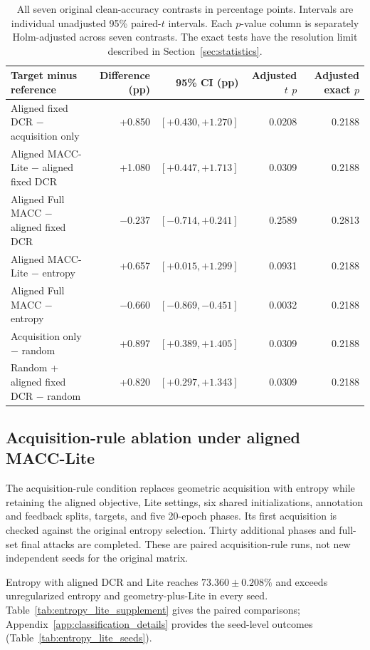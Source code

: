 \documentclass[a4paper,fleqn]{cas-dc}
\let\CAENLcaption\caption
\let\caption\CAENLcaption
\begin{document}
\begin{table}[pos=tbp]
\caption{All seven original clean-accuracy contrasts in percentage
points. Intervals are individual unadjusted 95\% paired-$t$
intervals. Each $p$-value column is separately Holm-adjusted
across seven contrasts. The exact tests have the resolution
limit described in Section~\ref{sec:statistics}.}
\label{tab:planned_contrasts}
\centering\small
\begin{tabularx}{\textwidth}{@{}Yrrrr@{}}
\toprule
Target minus reference & Difference (pp) & 95\% CI (pp) &
Adjusted $t$ $p$ & Adjusted exact $p$ \\
\midrule
Aligned fixed DCR $-$ acquisition only &
+0.850 & $[+0.430,+1.270]$ & 0.0208 & 0.2188 \\
Aligned MACC-Lite $-$ aligned fixed DCR &
+1.080 & $[+0.447,+1.713]$ & 0.0309 & 0.2188 \\
Aligned Full MACC $-$ aligned fixed DCR &
$-0.237$ & $[-0.714,+0.241]$ & 0.2589 & 0.2813 \\
Aligned MACC-Lite $-$ entropy &
+0.657 & $[+0.015,+1.299]$ & 0.0931 & 0.2188 \\
Aligned Full MACC $-$ entropy &
$-0.660$ & $[-0.869,-0.451]$ & 0.0032 & 0.2188 \\
Acquisition only $-$ random &
+0.897 & $[+0.389,+1.405]$ & 0.0309 & 0.2188 \\
Random + aligned fixed DCR $-$ random &
+0.820 & $[+0.297,+1.343]$ & 0.0309 & 0.2188 \\
\bottomrule
\end{tabularx}
\end{table}


\subsection{Acquisition-rule ablation under aligned MACC-Lite}
\label{sec:entropy_lite}

The acquisition-rule condition replaces geometric acquisition with
entropy while retaining the aligned objective, Lite settings,
six shared initializations, annotation and feedback splits,
targets, and five 20-epoch phases.
Its first acquisition is checked against the original entropy
selection. Thirty additional phases and full-set final attacks
are completed. These are paired acquisition-rule runs,
not new independent seeds for the original matrix.

Entropy with aligned DCR and Lite reaches
$73.360\pm0.208\%$ and exceeds unregularized entropy and
geometry-plus-Lite in every seed.
Table~\ref{tab:entropy_lite_supplement} gives the paired comparisons;
Appendix~\ref{app:classification_details} provides the seed-level
outcomes (Table~\ref{tab:entropy_lite_seeds}).
\end{document}
